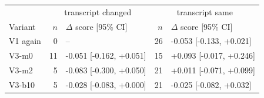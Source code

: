 \begin{tabular}{lrlrl}
\toprule
 & \multicolumn{2}{c}{transcript changed} & \multicolumn{2}{c}{transcript same} \\
Variant & $n$ & $\Delta$ score [95\% CI] & $n$ & $\Delta$ score [95\% CI] \\
\midrule
V1 again & 0 & -- & 26 & -0.053 [-0.133, +0.021] \\
V3-m0 & 11 & -0.051 [-0.162, +0.051] & 15 & +0.093 [-0.017, +0.246] \\
V3-m2 & 5 & -0.083 [-0.300, +0.050] & 21 & +0.011 [-0.071, +0.099] \\
V3-b10 & 5 & -0.028 [-0.083, +0.000] & 21 & -0.025 [-0.082, +0.032] \\
\bottomrule
\end{tabular}
